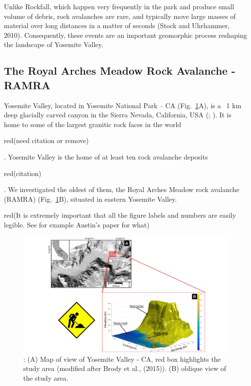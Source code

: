 \documentclass[5p]{elsarticle}
\newcommand{\alon}{\begin{color}{red}}
\newcommand{\aloff}{\end{color}}
\begin{document}
Unlike Rockfall, which happen very frequently in the park and produce small volume of debris, rock avalanches are rare, and typically move large masses of material over long distances in a matter of seconds (Stock and Uhrhammer, 2010). Consequently, these events are an important geomorphic process reshaping the landscape of Yosemite Valley. 




\subsection{The Royal Arches Meadow Rock Avalanche - RAMRA}

Yosemite Valley, located in Yosemite National Park -- CA (Fig.~\ref{Study_Area}A), is a ~1  km deep glacially carved canyon in the Sierra Nevada, California, USA (\cite{matthes1930geologic}; \cite{huber1987geologic}). It is home to some of the largest granitic rock faces in the world \alon (need citation or remove)\aloff. Yosemite Valley is the home of at least ten rock avalanche deposits \alon(citation)\aloff. We investigated the oldest of them, the Royal Arches Meadow rock avalanche (RAMRA) (Fig.~\ref{Study_Area}B), situated in eastern Yosemite Valley. \alon(It is extremely important that all the figure labels and numbers are easily legible. See for example Austin's paper for what)\aloff

									\begin{figure}[h]

	\includegraphics[width=\textwidth]{Figures/Study_Area.pdf}
		\caption{: (A) Map of view of Yosemite Valley - CA, red box highlights the study area (modified after Brody et al., (2015)). (B) oblique view of the study area.  \label{Study_Area}}


									\end{figure}
\end{document}
